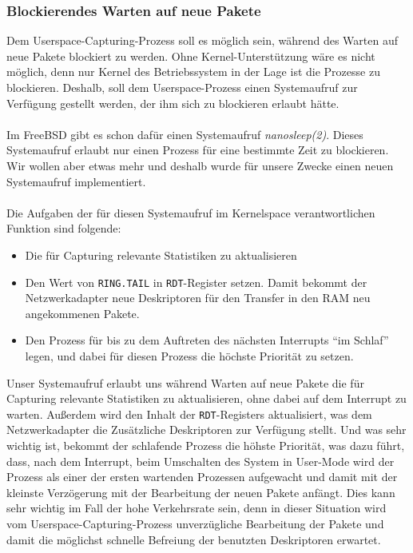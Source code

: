 \subsubsection*{Blockierendes Warten auf neue Pakete}
Dem Userspace-Capturing-Prozess soll es möglich sein, während des Warten auf
neue Pakete blockiert zu werden. Ohne Kernel-Unterstützung wäre es nicht
möglich, denn nur Kernel des Betriebssystem in der Lage ist die
Prozesse zu blockieren.  Deshalb, soll dem Userspace-Prozess einen Systemaufruf
zur Verfügung gestellt werden, der ihm sich zu blockieren erlaubt hätte. \\\\
%
Im FreeBSD gibt es schon dafür einen Systemaufruf \emph{nanosleep(2)}. Dieses 
Systemaufruf erlaubt nur einen Prozess für eine bestimmte Zeit zu blockieren. 
Wir wollen aber etwas mehr und deshalb wurde für unsere Zwecke einen 
neuen Systemaufruf implementiert. \\\\
%
Die Aufgaben der für diesen Systemaufruf im Kernelspace verantwortlichen
Funktion sind folgende: 
\begin{itemize}
	\item Die für Capturing relevante Statistiken zu aktualisieren
	\item Den Wert von \verb+RING.TAIL+ in \verb+RDT+-Register
		setzen. Damit bekommt der Netzwerkadapter neue Deskriptoren für 
		den Transfer in den RAM neu angekommenen Pakete.
	\item Den Prozess für bis zu dem Auftreten des nächsten Interrupts 
		``im Schlaf'' legen, und dabei für diesen Prozess die höchste
		Priorität zu setzen.
\end{itemize}
Unser Systemaufruf erlaubt uns während Warten auf neue Pakete die für Capturing
relevante Statistiken zu aktualisieren, ohne dabei auf dem Interrupt zu warten.
Außerdem wird den Inhalt der \verb+RDT+-Registers aktualisiert, was dem Netzwerkadapter
die Zusätzliche Deskriptoren zur Verfügung stellt.  Und was sehr wichtig ist,
bekommt der schlafende Prozess die höhste Priorität, was dazu führt, dass, nach
dem Interrupt, beim Umschalten des System in User-Mode wird der Prozess als
einer der ersten wartenden Prozessen aufgewacht und damit mit der kleinste
Verzögerung mit der Bearbeitung der neuen Pakete anfängt. Dies kann sehr
wichtig im Fall der hohe Verkehrsrate sein, denn in dieser Situation wird vom
Userspace-Capturing-Prozess unverzügliche Bearbeitung der Pakete und damit die
möglichst schnelle Befreiung der benutzten Deskriptoren erwartet.
 

